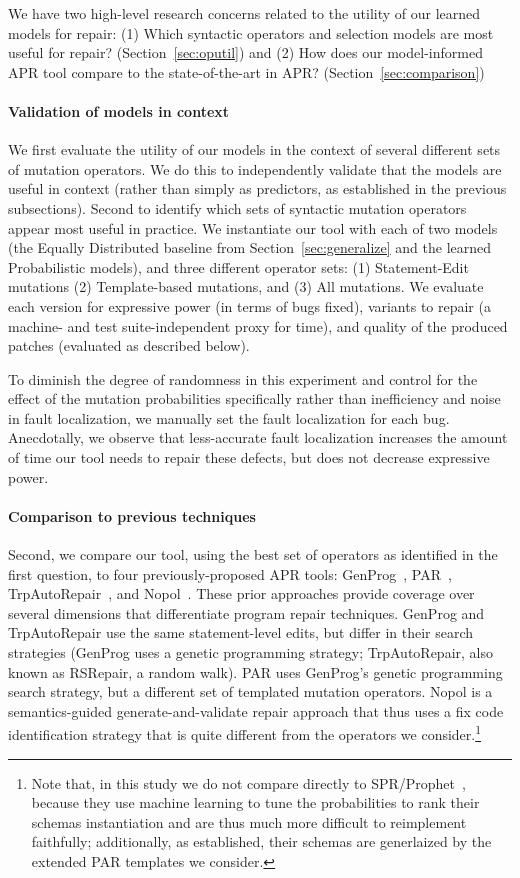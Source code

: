 \documentclass[conference]{IEEEtran}
\begin{document}
We have two high-level research concerns related to the utility of our
learned models for repair: 
(1) Which syntactic operators and selection models are most
  useful for repair? (Section~\ref{sec:oputil}) and (2)
How does our model-informed APR tool compare to the
    state-of-the-art in APR? (Section~\ref{sec:comparison})

\paragraph{Validation of models in context} We first evaluate the utility of our models in the
context of several different sets of mutation operators.  We do this to
independently validate that the models are useful in context (rather than simply
as predictors, as established in the previous subsections). Second to
identify which sets of syntactic mutation operators appear most useful in
practice. We
instantiate our tool with each of 
two models (the Equally Distributed baseline from Section~\ref{sec:generalize}
and the learned Probabilistic models), and three different operator sets: (1) Statement-Edit mutations (2)
Template-based mutations, and (3) All mutations. We evaluate each version
for expressive power (in terms of bugs fixed), variants to repair (a machine-
and test suite-independent proxy for time), and quality of the produced patches
(evaluated as described below). 

To diminish the degree of randomness in this experiment and control for the
effect of the mutation probabilities specifically rather than inefficiency and
noise in fault localization, we manually set the fault localization for each
bug. Anecdotally, we observe that less-accurate fault localization increases the
amount of time our tool needs to repair these defects, but does not decrease expressive
power.  

\paragraph{Comparison to previous techniques} Second, we compare our tool, using
the best set of operators as identified in the first question, to four
previously-proposed APR tools: GenProg~\cite{legoues12Genprog}, PAR~\cite{kim2013}, TrpAutoRepair~\cite{Qi13TrpAutoR},
and Nopol~\cite{xuanNopol}. These prior approaches provide coverage over
several dimensions that differentiate program repair techniques.  GenProg and
TrpAutoRepair use the same statement-level edits, but differ in their search
strategies (GenProg uses a genetic programming strategy; TrpAutoRepair, also
known as RSRepair, a random walk). PAR uses GenProg's genetic programming search
strategy, but a different set of templated mutation operators.  Nopol is a
semantics-guided generate-and-validate repair approach that thus uses a fix code
identification strategy that is quite different from the operators we
consider.\footnote{Note that, in this study we do not compare directly to
  SPR/Prophet~\cite{long16proph}, because they use machine learning to tune the
  probabilities to rank their schemas instantiation and are thus much more
  difficult to reimplement faithfully; additionally, as established, their
  schemas are generlaized by the extended PAR templates we consider.}
\end{document}
